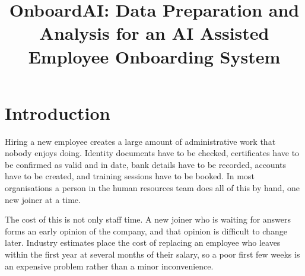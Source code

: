 \documentclass[conference]{IEEEtran}
\begin{document}
\title{OnboardAI: Data Preparation and Analysis for an AI Assisted Employee Onboarding System}

\author{
\and
{}
\linebreak
{}
\and
{}
}

\maketitle

\section{Introduction}
Hiring a new employee creates a large amount of administrative work that nobody enjoys doing. Identity documents have to be checked, certificates have to be confirmed as valid and in date, bank details have to be recorded, accounts have to be created, and training sessions have to be booked. In most organisations a person in the human resources team does all of this by hand, one new joiner at a time.

The cost of this is not only staff time. A new joiner who is waiting for answers forms an early opinion of the company, and that opinion is difficult to change later. Industry estimates place the cost of replacing an employee who leaves within the first year at several months of their salary, so a poor first few weeks is an expensive problem rather than a minor inconvenience.
\end{document}
